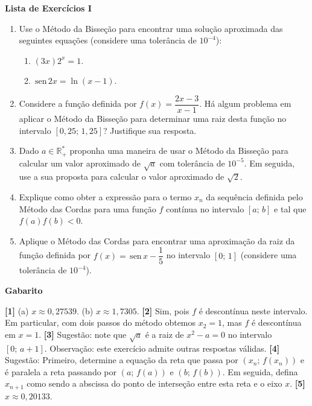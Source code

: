 \documentclass[12pt,a4paper]{article}
\newcommand{\sen}{\,\textrm{sen}\,}
\begin{document}
\begin{center}
 \textbf{Lista de Exercícios I}
\end{center}

\begin{enumerate}
\item Use o Método da Bisseção para encontrar uma solução aproximada das seguintes equações (considere uma tolerância de $10^{-4}$):
 \begin{enumerate}
  \item $(3x)2^x = 1$. 
  \item $\sen 2x = \ln (x - 1)$.
 \end{enumerate}

 \item Considere a função definida por $f(x) = \dfrac{2x - 3}{x-1}$. Há algum problema em aplicar o Método da Bisseção para determinar uma raiz desta função no intervalo $[0,25;\,1,25]$? Justifique sua resposta.

 \item Dado $a\in\mathbb{R}_+^*$ proponha uma maneira de usar o Método da Bisseção para calcular um valor aproximado de $\sqrt{a}$ com tolerância de $10^{-5}$. Em seguida, use a sua 
proposta para calcular o valor aproximado de $\sqrt{2}$.

 \item Explique como obter a expressão para o termo $x_n$ da sequência definida pelo Método das Cordas para uma função $f$ contínua no intervalo $[a;\,b]$ e tal que $f(a)f(b)<0$.
  
 \item Aplique o Método das Cordas para encontrar uma aproximação da raiz da função definida por $f(x) = \sen x - \dfrac{1}{5}$ no intervalo $[0;\,1]$ (considere uma tolerância de $10^{-4}$).
\end{enumerate}

\begin{center}
\textbf{Gabarito}
\end{center}
\textbf{[1]} (a) $x\approx 0,27539$. (b) $x\approx 1,7305$. 
\textbf{[2]} Sim, pois $f$ é descontínua neste intervalo. Em particular, com dois passos do método obtemos $x_2 = 1$, mas $f$ é descontínua em $x = 1$. 
\textbf{[3]} Sugestão: note que $\sqrt{a}$ é a raiz de $x^2 - a = 0$ no intervalo $[0;\,a+1]$. Observação: este exercício admite outras respostas válidas. 
\textbf{[4]} Sugestão: Primeiro, determine a equação da reta que passa por $(x_n;\,f(x_n))$ e é paralela a reta passando por $(a;\,f(a))$ e $(b;\,f(b))$. Em seguida, 
defina $x_{n+1}$ como sendo a abscissa do ponto de interseção entre esta reta e o eixo $x$. 
\textbf{[5]} $x\approx 0,20133$.
\end{document}
